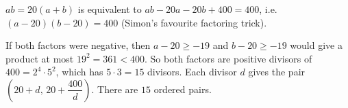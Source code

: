 $ab=20(a+b)$ is equivalent to $ab-20a-20b+400=400$, i.e. $(a-20)(b-20)=400$ (Simon's favourite factoring trick).

If both factors were negative, then $a-20\ge-19$ and $b-20\ge-19$ would give a product at most $19^2=361<400$. So both factors are positive divisors of $400=2^4\cdot5^2$, which has $5\cdot3=15$ divisors. Each divisor $d$ gives the pair $(20+d,\,20+\dfrac{400}d)$. There are $\boxed{15}$ ordered pairs.
